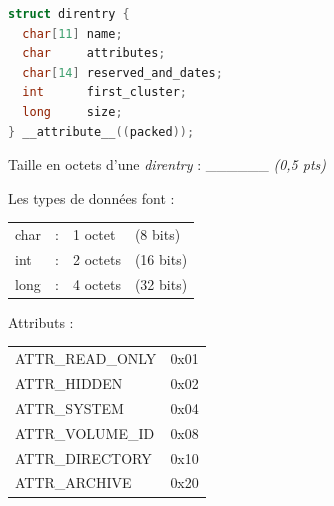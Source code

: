 \documentclass[11pt,a4paper]{article}
\begin{document}
\begin{table}[ht!]
  \centering
  \begin{minipage}{0.51\textwidth}
    \centering


\begin{lstlisting}[language=C]
struct direntry {
  char[11] name;
  char     attributes;
  char[14] reserved_and_dates;
  int      first_cluster;
  long     size;
} __attribute__((packed)); \end{lstlisting}

Taille en octets d'une \textit{direntry} : \_\_\_\_\_\_ \textit{(0,5 pts)}

  \end{minipage}
  \hfillx
  \begin{minipage}{0.39\textwidth}

Les types de données font :

\smallskip

\begin{tabular}{l l l l}
char & : & 1 octet  & (8 bits)  \\
int  & : & 2 octets & (16 bits) \\
long & : & 4 octets & (32 bits) \\
\end{tabular}


\medskip

Attributs :

\medskip

\begin{tabular}{l l}
ATTR\_READ\_ONLY & 0x01 \\
ATTR\_HIDDEN     & 0x02 \\
ATTR\_SYSTEM     & 0x04 \\
ATTR\_VOLUME\_ID & 0x08 \\
ATTR\_DIRECTORY  & 0x10 \\
ATTR\_ARCHIVE    & 0x20 \\
\end{tabular}

  \end{minipage}
\end{table}
\end{document}
